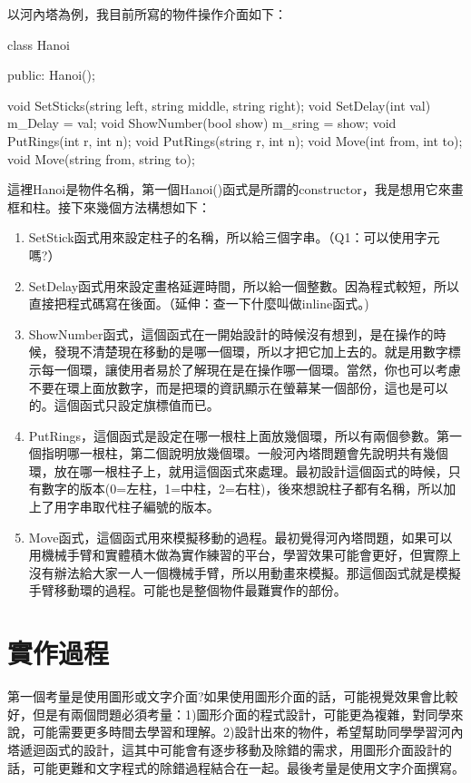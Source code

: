 \documentclass[12pt,a4paper]{article}
\begin{document}
\vspace{0.5cm}
\noindent 以河內塔為例，我目前所寫的物件操作介面如下：
\begin{cppcode}
class Hanoi {
public:
	Hanoi();
	
	void SetSticks(string left, string middle, string right);
	void SetDelay(int val) { m_Delay = val; }
	void ShowNumber(bool show) { m_sring = show; }
	void PutRings(int r, int n);
	void PutRings(string r, int n);
	void Move(int from, int to);
	void Move(string from, string to);
}
\end{cppcode}
這裡Hanoi是物件名稱，第一個Hanoi()函式是所謂的constructor，我是想用它來畫框和柱。接下來幾個方法構想如下：
\begin{enumerate}
	\item SetStick函式用來設定柱子的名稱，所以給三個字串。（Q1：可以使用字元嗎?）
	\item SetDelay函式用來設定畫格延遲時間，所以給一個整數。因為程式較短，所以直接把程式碼寫在後面。（延伸：查一下什麼叫做inline函式。)
	\item ShowNumber函式，這個函式在一開始設計的時候沒有想到，是在操作的時候，發現不清楚現在移動的是哪一個環，所以才把它加上去的。就是用數字標示每一個環，讓使用者易於了解現在是在操作哪一個環。當然，你也可以考慮不要在環上面放數字，而是把環的資訊顯示在螢幕某一個部份，這也是可以的。這個函式只設定旗標值而已。
	\item PutRings，這個函式是設定在哪一根柱上面放幾個環，所以有兩個參數。第一個指明哪一根柱，第二個說明放幾個環。一般河內塔問題會先說明共有幾個環，放在哪一根柱子上，就用這個函式來處理。最初設計這個函式的時候，只有數字的版本(0=左柱，1=中柱，2=右柱)，後來想說柱子都有名稱，所以加上了用字串取代柱子編號的版本。
	\item Move函式，這個函式用來模擬移動的過程。最初覺得河內塔問題，如果可以用機械手臂和實體積木做為實作練習的平台，學習效果可能會更好，但實際上沒有辦法給大家一人一個機械手臂，所以用動畫來模擬。那這個函式就是模擬手臂移動環的過程。可能也是整個物件最難實作的部份。
\end{enumerate}
\vspace{1cm}

\section{實作過程}
第一個考量是使用圖形或文字介面?如果使用圖形介面的話，可能視覺效果會比較好，但是有兩個問題必須考量：1)圖形介面的程式設計，可能更為複雜，對同學來說，可能需要更多時間去學習和理解。2)設計出來的物件，希望幫助同學學習河內塔遞迴函式的設計，這其中可能會有逐步移動及除錯的需求，用圖形介面設計的話，可能更難和文字程式的除錯過程結合在一起。最後考量是使用文字介面撰寫。
\end{document}
